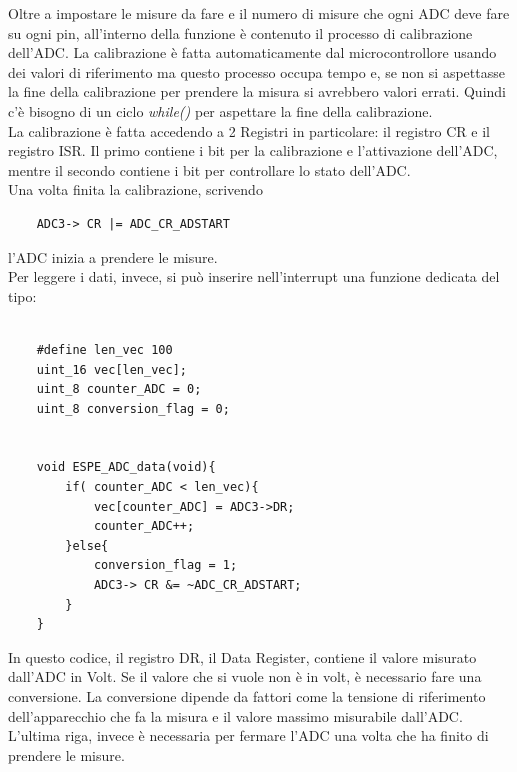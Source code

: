 Oltre a impostare le misure da fare e il numero di misure che ogni ADC deve fare su ogni pin, all'interno della funzione è contenuto il processo di calibrazione dell'ADC. La calibrazione è fatta automaticamente dal microcontrollore usando dei valori di riferimento ma questo processo occupa tempo e, se non si aspettasse la fine della calibrazione per prendere la misura si avrebbero valori errati. Quindi c'è bisogno di un ciclo \textit{while()} per aspettare la fine della calibrazione.\\

La calibrazione è fatta accedendo a 2 Registri in particolare: il registro CR e il registro ISR. Il primo contiene i bit per la calibrazione e l'attivazione dell'ADC, mentre il secondo contiene i bit per controllare lo stato dell'ADC.\\

Una volta finita la calibrazione,  scrivendo
\noindent

\begin{verbatim}
    ADC3-> CR |= ADC_CR_ADSTART
\end{verbatim}
l'ADC inizia a prendere le misure.\\
Per leggere i dati, invece, si può inserire nell'interrupt una funzione dedicata del tipo:

\noindent
\begin{verbatim}

    #define len_vec 100
    uint_16 vec[len_vec];
    uint_8 counter_ADC = 0;
    uint_8 conversion_flag = 0;

    
    void ESPE_ADC_data(void){
        if( counter_ADC < len_vec){
            vec[counter_ADC] = ADC3->DR;
            counter_ADC++;
        }else{
            conversion_flag = 1;
            ADC3-> CR &= ~ADC_CR_ADSTART;
        }
    }

\end{verbatim}
\label{code:ADC_data}

In questo codice, il registro DR, il Data Register, contiene il valore misurato dall'ADC in Volt. Se il valore che si vuole non è in volt, è necessario fare una conversione. La conversione dipende da fattori come la tensione di riferimento dell'apparecchio che fa la misura e il valore massimo misurabile dall'ADC.\\

L'ultima riga, invece è necessaria per fermare l'ADC una volta che ha finito di prendere le misure.\\
